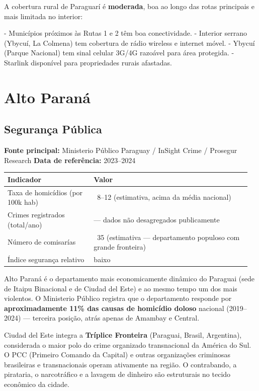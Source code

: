 A cobertura rural de Paraguarí é \textbf{moderada}, boa ao longo das rotas principais e mais limitada no interior:

- Municípios próximos às Rutas 1 e 2 têm boa conectividade.
- Interior serrano (Ybycuí, La Colmena) tem cobertura de rádio wireless e internet móvel.
- Ybycuí (Parque Nacional) tem sinal celular 3G/4G razoável para área protegida.
- Starlink disponível para propriedades rurais afastadas.





\clearpage
\section{Alto Paraná}
\label{sec:dept_10_Alto_Parana}

\subsection{Segurança Pública}

\textbf{Fonte principal:} Ministerio Público Paraguay / InSight Crime / Prosegur Research
\textbf{Data de referência:} 2023--2024


{\small
\setlength{\tabcolsep}{3pt}
\renewcommand{\arraystretch}{1.12}
\begin{tabularx}{\linewidth}{>{\raggedright\arraybackslash}p{0.34\linewidth} >{\raggedright\arraybackslash}p{0.62\linewidth}}
\toprule
Indicador & Valor \\
\midrule
Taxa de homicídios (por 100k hab) & ~8--12 (estimativa, acima da média nacional) \\
Crimes registrados (total/ano) & --- dados não desagregados publicamente \\
Número de comisarías & ~35 (estimativa --- departamento populoso com grande fronteira) \\
Índice segurança relativo & baixo \\
\bottomrule
\end{tabularx}
}


Alto Paraná é o departamento mais economicamente dinâmico do Paraguai (sede de Itaipu Binacional e de Ciudad del Este) e ao mesmo tempo um dos mais violentos. O Ministerio Público registra que o departamento responde por \textbf{aproximadamente 11\% das causas de homicídio doloso} nacional (2019--2024) --- terceira posição, atrás apenas de Amambay e Central.

Ciudad del Este integra a \textbf{Tríplice Fronteira} (Paraguai, Brasil, Argentina), considerada o maior polo do crime organizado transnacional da América do Sul. O PCC (Primeiro Comando da Capital) e outras organizações criminosas brasileiras e transnacionais operam ativamente na região. O contrabando, a pirataria, o narcotráfico e a lavagem de dinheiro são estruturais no tecido econômico da cidade.

